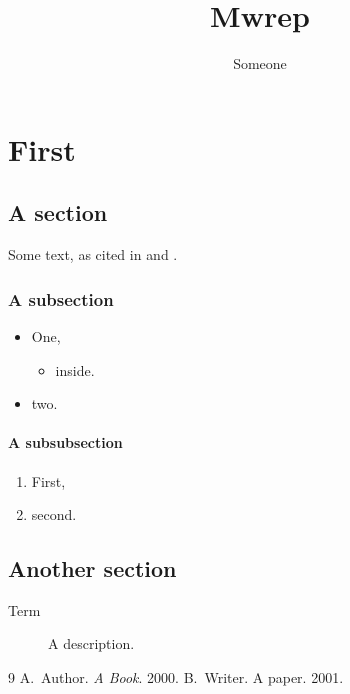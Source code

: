 \documentclass{mwrep}
\title{Mwrep}
\author{Someone}
\begin{document}
\maketitle
\tableofcontents
\chapter{First}
\section{A section}
Some text, as cited in \cite{book} and \cite{paper}.
\subsection{A subsection}
\begin{itemize}
    \item One,
    \begin{itemize}
        \item inside.
    \end{itemize}
    \item two.
\end{itemize}
\subsubsection{A subsubsection}
\begin{enumerate}
    \item First,
    \item second.
\end{enumerate}
\section{Another section}
\begin{description}
    \item[Term] A description.
\end{description}
\begin{thebibliography}{9}
 A.~Author. \emph{A Book}. 2000.
 B.~Writer. A paper. 2001.
\end{thebibliography}
\end{document}
